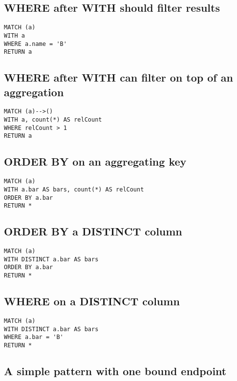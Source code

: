 \subsection{WHERE after WITH should filter results}

\begin{lstlisting}
MATCH (a)
WITH a
WHERE a.name = 'B'
RETURN a
\end{lstlisting}

\subsection{WHERE after WITH can filter on top of an aggregation}

\begin{lstlisting}
MATCH (a)-->()
WITH a, count(*) AS relCount
WHERE relCount > 1
RETURN a
\end{lstlisting}

\subsection{ORDER BY on an aggregating key}

\begin{lstlisting}
MATCH (a)
WITH a.bar AS bars, count(*) AS relCount
ORDER BY a.bar
RETURN *
\end{lstlisting}

\subsection{ORDER BY a DISTINCT column}

\begin{lstlisting}
MATCH (a)
WITH DISTINCT a.bar AS bars
ORDER BY a.bar
RETURN *
\end{lstlisting}

\subsection{WHERE on a DISTINCT column}

\begin{lstlisting}
MATCH (a)
WITH DISTINCT a.bar AS bars
WHERE a.bar = 'B'
RETURN *
\end{lstlisting}

\subsection{A simple pattern with one bound endpoint}

